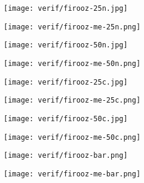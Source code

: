 \begin{figure}
\begin{subfigure}{0.5\textwidth} %
\texttt{[image: verif/firooz-25n.jpg]} 
\end{subfigure}
\begin{subfigure}{0.5\textwidth} %
\texttt{[image: verif/firooz-me-25n.png]}
\end{subfigure}
\begin{subfigure}{0.5\textwidth} %
\texttt{[image: verif/firooz-50n.jpg]} 
\end{subfigure}
\begin{subfigure}{0.5\textwidth} %
\texttt{[image: verif/firooz-me-50n.png]} 
\end{subfigure}
\begin{subfigure}{0.5\textwidth} %
\texttt{[image: verif/firooz-25c.jpg]} 
\end{subfigure}
\begin{subfigure}{0.5\textwidth} %
\texttt{[image: verif/firooz-me-25c.png]} 
\end{subfigure}
\begin{subfigure}{0.5\textwidth} %
\texttt{[image: verif/firooz-50c.jpg]} 
\end{subfigure}
\begin{subfigure}{0.5\textwidth} %
\texttt{[image: verif/firooz-me-50c.png]}
\end{subfigure}
\begin{subfigure}{0.5\textwidth} %
\texttt{[image: verif/firooz-bar.png]} 
\label{fig:4firoozres-him}
\end{subfigure}
\begin{subfigure}{0.5\textwidth} %
\texttt{[image: verif/firooz-me-bar.png]}
\label{fig:4firoozres-me}
\end{subfigure}
\label{fig:4firoozres}
\end{figure}

